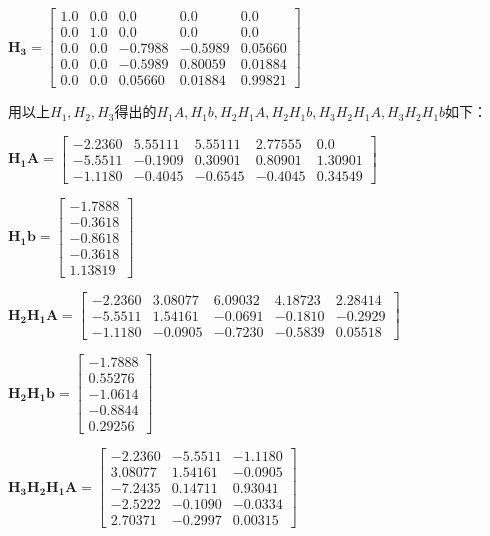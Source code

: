 \documentclass[UTF8]{ctexart}
\begin{document}
$\mathbf{H_3}=\left[\begin{array}{cccccc}
									{1.0}&{0.0}&{0.0}&{0.0}&{0.0}\\
{0.0}&{1.0}&{0.0}&{0.0}&{0.0}\\
{0.0}&{0.0}&{-0.7988}&{-0.5989}&{0.05660}\\
{0.0}&{0.0}&{-0.5989}&{0.80059}&{0.01884}\\
{0.0}&{0.0}&{0.05660}&{0.01884}&{0.99821}
									 \end{array}\right]$


用以上$H_1,H_2,H_3$得出的$H_1A,H_1b,H_2H_1A,H_2H_1b,H_3H_2H_1A,H_3H_2H_1b$如下：

$\mathbf{H_1A}=\left[\begin{array}{cccccc}
									{-2.2360}&{5.55111}&{5.55111}&{2.77555}&{0.0}\\
{-5.5511}&{-0.1909}&{0.30901}&{0.80901}&{1.30901}\\
{-1.1180}&{-0.4045}&{-0.6545}&{-0.4045}&{0.34549}
									 \end{array}\right]$

$\mathbf{H_1b}=\left[\begin{array}{cccccc}
									{-1.7888}\\
{-0.3618}\\
{-0.8618}\\
{-0.3618}\\
{1.13819}
									 \end{array}\right]$



$\mathbf{H_2H_1A}=\left[\begin{array}{cccccc}
									{-2.2360}&{3.08077}&{6.09032}&{4.18723}&{2.28414}\\
{-5.5511}&{1.54161}&{-0.0691}&{-0.1810}&{-0.2929}\\
{-1.1180}&{-0.0905}&{-0.7230}&{-0.5839}&{0.05518}
									 \end{array}\right]$


$\mathbf{H_2H_1b}=\left[\begin{array}{cccccc}
									{-1.7888}\\
{0.55276}\\
{-1.0614}\\
{-0.8844}\\
{0.29256}
									 \end{array}\right]$


$\mathbf{H_3H_2H_1A}=\left[\begin{array}{cccccc}
									{-2.2360}&{-5.5511}&{-1.1180}\\
{3.08077}&{1.54161}&{-0.0905}\\
{-7.2435}&{0.14711}&{0.93041}\\
{-2.5222}&{-0.1090}&{-0.0334}\\
{2.70371}&{-0.2997}&{0.00315}
									 \end{array}\right]$
\end{document}
